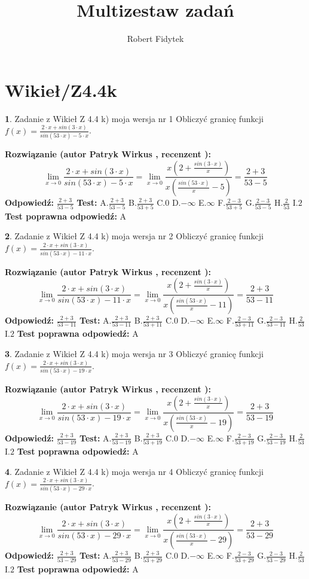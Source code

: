 \documentclass[12pt, a4paper]{article}
\title{Multizestaw zadań}
\author{Robert Fidytek}
\date{}
\theoremstyle{definition} %
\newtheorem{zad}{}
\newcommand{\kategoria}[1]{\section{#1}}
\newcommand{\zadStart}[1]{\begin{zad}#1\newline}
\newcommand{\zadStop}{\end{zad}}
\newcommand{\rozwStart}[2]{\noindent \textbf{Rozwiązanie (autor #1 , recenzent #2): }\newline}
\newcommand{\rozwStop}{\newline}
\newcommand{\odpStart}{\noindent \textbf{Odpowiedź:}\newline}
\newcommand{\odpStop}{\newline}
\newcommand{\testStart}{\noindent \textbf{Test:}\newline}
\newcommand{\testStop}{\newline}
\newcommand{\kluczStart}{\noindent \textbf{Test poprawna odpowiedź:}\newline}
\newcommand{\kluczStop}{\newline}
\begin{document}
\maketitle

\kategoria{Wikieł/Z4.4k}


\zadStart{Zadanie z Wikieł Z 4.4 k) moja wersja nr 1}
Obliczyć granicę funkcji $f(x)=\frac{2\cdot x +sin(3\cdot x)}{sin(53\cdot x) -5\cdot x}$.
\zadStop
\rozwStart{Patryk Wirkus}{}
$$\lim\limits_{x\to 0}\frac{2\cdot x +sin(3\cdot x)}{sin(53\cdot x) -5\cdot x}
=\lim\limits_{x\to 0}\frac{x(2+\frac{sin(3\cdot x)}{x})}{x(\frac{sin(53\cdot x)}{x}-5)}
=\frac{2+3}{53-5}$$
\rozwStop
\odpStart
$\frac{2+3}{53-5}$
\odpStop
\testStart
A.$\frac{2+3}{53-5}$
B.$\frac{2+3}{53+5}$
C.$0$
D.$-\infty$
E.$\infty$
F.$\frac{2-3}{53+5}$
G.$\frac{2-3}{53-5}$
H.$\frac{2}{53}$
I.$2$
\testStop
\kluczStart
A
\kluczStop



\zadStart{Zadanie z Wikieł Z 4.4 k) moja wersja nr 2}
Obliczyć granicę funkcji $f(x)=\frac{2\cdot x +sin(3\cdot x)}{sin(53\cdot x) -11\cdot x}$.
\zadStop
\rozwStart{Patryk Wirkus}{}
$$\lim\limits_{x\to 0}\frac{2\cdot x +sin(3\cdot x)}{sin(53\cdot x) -11\cdot x}
=\lim\limits_{x\to 0}\frac{x(2+\frac{sin(3\cdot x)}{x})}{x(\frac{sin(53\cdot x)}{x}-11)}
=\frac{2+3}{53-11}$$
\rozwStop
\odpStart
$\frac{2+3}{53-11}$
\odpStop
\testStart
A.$\frac{2+3}{53-11}$
B.$\frac{2+3}{53+11}$
C.$0$
D.$-\infty$
E.$\infty$
F.$\frac{2-3}{53+11}$
G.$\frac{2-3}{53-11}$
H.$\frac{2}{53}$
I.$2$
\testStop
\kluczStart
A
\kluczStop



\zadStart{Zadanie z Wikieł Z 4.4 k) moja wersja nr 3}
Obliczyć granicę funkcji $f(x)=\frac{2\cdot x +sin(3\cdot x)}{sin(53\cdot x) -19\cdot x}$.
\zadStop
\rozwStart{Patryk Wirkus}{}
$$\lim\limits_{x\to 0}\frac{2\cdot x +sin(3\cdot x)}{sin(53\cdot x) -19\cdot x}
=\lim\limits_{x\to 0}\frac{x(2+\frac{sin(3\cdot x)}{x})}{x(\frac{sin(53\cdot x)}{x}-19)}
=\frac{2+3}{53-19}$$
\rozwStop
\odpStart
$\frac{2+3}{53-19}$
\odpStop
\testStart
A.$\frac{2+3}{53-19}$
B.$\frac{2+3}{53+19}$
C.$0$
D.$-\infty$
E.$\infty$
F.$\frac{2-3}{53+19}$
G.$\frac{2-3}{53-19}$
H.$\frac{2}{53}$
I.$2$
\testStop
\kluczStart
A
\kluczStop



\zadStart{Zadanie z Wikieł Z 4.4 k) moja wersja nr 4}
Obliczyć granicę funkcji $f(x)=\frac{2\cdot x +sin(3\cdot x)}{sin(53\cdot x) -29\cdot x}$.
\zadStop
\rozwStart{Patryk Wirkus}{}
$$\lim\limits_{x\to 0}\frac{2\cdot x +sin(3\cdot x)}{sin(53\cdot x) -29\cdot x}
=\lim\limits_{x\to 0}\frac{x(2+\frac{sin(3\cdot x)}{x})}{x(\frac{sin(53\cdot x)}{x}-29)}
=\frac{2+3}{53-29}$$
\rozwStop
\odpStart
$\frac{2+3}{53-29}$
\odpStop
\testStart
A.$\frac{2+3}{53-29}$
B.$\frac{2+3}{53+29}$
C.$0$
D.$-\infty$
E.$\infty$
F.$\frac{2-3}{53+29}$
G.$\frac{2-3}{53-29}$
H.$\frac{2}{53}$
I.$2$
\testStop
\kluczStart
A
\kluczStop
\end{document}
